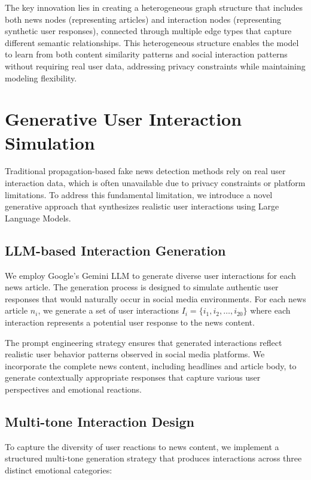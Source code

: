 The key innovation lies in creating a heterogeneous graph structure that includes both news nodes (representing articles) and interaction nodes (representing synthetic user responses), connected through multiple edge types that capture different semantic relationships. This heterogeneous structure enables the model to learn from both content similarity patterns and social interaction patterns without requiring real user data, addressing privacy constraints while maintaining modeling flexibility.

\section{Generative User Interaction Simulation}

Traditional propagation-based fake news detection methods rely on real user interaction data, which is often unavailable due to privacy constraints or platform limitations. To address this fundamental limitation, we introduce a novel generative approach that synthesizes realistic user interactions using Large Language Models.

\subsection{LLM-based Interaction Generation}

We employ Google's Gemini LLM to generate diverse user interactions for each news article. The generation process is designed to simulate authentic user responses that would naturally occur in social media environments. For each news article $n_i$, we generate a set of user interactions $I_i = \{i_1, i_2, \ldots, i_{20}\}$ where each interaction represents a potential user response to the news content.

The prompt engineering strategy ensures that generated interactions reflect realistic user behavior patterns observed in social media platforms. We incorporate the complete news content, including headlines and article body, to generate contextually appropriate responses that capture various user perspectives and emotional reactions.

\subsection{Multi-tone Interaction Design}

To capture the diversity of user reactions to news content, we implement a structured multi-tone generation strategy that produces interactions across three distinct emotional categories:

